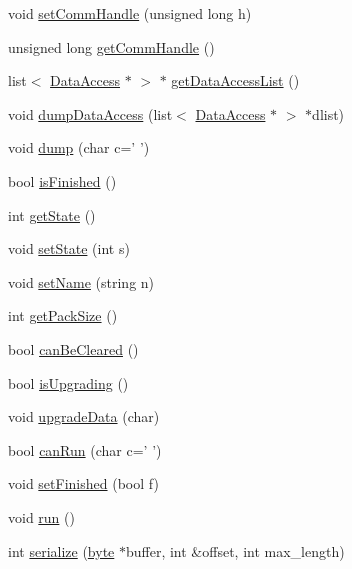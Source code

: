 \begin{DoxyCompactItemize}
\item 
void \hyperlink{class_i_ductteip_task_ad0ae24379f4794c3363d1e94a1299c03}{setCommHandle} (unsigned long h)
\item 
unsigned long \hyperlink{class_i_ductteip_task_a9c7685d69efbb5b72a303138dd96521d}{getCommHandle} ()
\item 
list$<$ \hyperlink{struct_data_access}{DataAccess} $\ast$ $>$ $\ast$ \hyperlink{class_i_ductteip_task_a57d9c01e2a2d7603a46b18b9b7391228}{getDataAccessList} ()
\item 
void \hyperlink{class_i_ductteip_task_ab3ea4b7cc3e270b83a4b75655b4efa57}{dumpDataAccess} (list$<$ \hyperlink{struct_data_access}{DataAccess} $\ast$ $>$ $\ast$dlist)
\item 
void \hyperlink{class_i_ductteip_task_aa9fae61a11236066513118d19ebd22b0}{dump} (char c=' ')
\item 
bool \hyperlink{class_i_ductteip_task_ab92791950ee2fe51cf1005421cb87695}{isFinished} ()
\item 
int \hyperlink{class_i_ductteip_task_a7422e06ba861c73d6e00907a4f905aef}{getState} ()
\item 
void \hyperlink{class_i_ductteip_task_a1bf76470ba95aee4ed77d059144be07f}{setState} (int s)
\item 
void \hyperlink{class_i_ductteip_task_a29e56abf2e5991acc91462c1bbdb1511}{setName} (string n)
\item 
int \hyperlink{class_i_ductteip_task_ae517fed47c21ca466216d17ece9ab41c}{getPackSize} ()
\item 
bool \hyperlink{class_i_ductteip_task_af7aba4ca30458f6d2c7bb2834406198f}{canBeCleared} ()
\item 
bool \hyperlink{class_i_ductteip_task_a2fb81b703881918d054382d6894f0a77}{isUpgrading} ()
\item 
void \hyperlink{class_i_ductteip_task_ae4ef33df082b9727f281fdaa1896bb89}{upgradeData} (char)
\item 
bool \hyperlink{class_i_ductteip_task_ad30ebd78861e6d0e7647a79393ccbcab}{canRun} (char c=' ')
\item 
void \hyperlink{class_i_ductteip_task_abef058563393dffda702745c2503998f}{setFinished} (bool f)
\item 
void \hyperlink{class_i_ductteip_task_abe3d6c79a56e71982297a88ff9a0921c}{run} ()
\item 
int \hyperlink{class_i_ductteip_task_a6f946dcbf504460e1a0de2672bcff1c2}{serialize} (\hyperlink{engine_8hpp_a0c8186d9b9b7880309c27230bbb5e69d}{byte} $\ast$buffer, int \&offset, int max\_\-length)

\end{DoxyCompactItemize}
